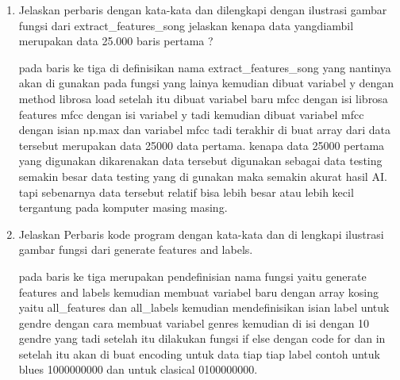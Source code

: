 \begin{enumerate}
\begin{figure}[!htbp]
      \caption{Ilustrasi gambar fungsi dari display\_mfcc() }
      \label{c122}
      \end{figure}

Gambar \ref{c122} tersebut merupakan hasil dari mfcc dari salah satu gender lagu pop yang ada pada datasets yang 1000 atau terdapat dalam sepuluh folder tadi.

\item Jelaskan perbaris dengan kata-kata dan dilengkapi dengan ilustrasi gambar fungsi dari extract\_features\_song jelaskan kenapa data yangdiambil merupakan data 25.000 baris pertama ? 



\subitem pada baris ke tiga di definisikan nama extract\_features\_song yang nantinya akan di gunakan pada fungsi yang lainya kemudian dibuat variabel y dengan method librosa load setelah itu dibuat variabel baru mfcc dengan isi librosa features mfcc dengan isi variabel y tadi kemudian dibuat variabel mfcc dengan isian np.max dan variabel mfcc tadi terakhir di buat array dari data tersebut merupakan data 25000 data pertama. kenapa data 25000 pertama yang digunakan dikarenakan data tersebut digunakan sebagai data testing semakin besar data testing yang di gunakan maka semakin akurat hasil AI. tapi sebenarnya data tersebut relatif bisa lebih besar atau lebih kecil tergantung pada komputer masing masing.

\item Jelaskan Perbaris kode program dengan kata-kata dan di lengkapi ilustrasi gambar fungsi dari generate features and labels.



\subitem pada baris ke tiga merupakan pendefinisian nama fungsi yaitu generate features and labels kemudian membuat variabel baru dengan array kosing yaitu all\_features dan all\_labels kemudian mendefinisikan isian label untuk gendre dengan cara membuat variabel genres kemudian di isi dengan 10 gendre yang tadi setelah itu dilakukan fungsi if else dengan code for dan in setelah itu akan di buat encoding untuk data tiap tiap label contoh untuk blues 1000000000 dan untuk clasical 0100000000.


\end{enumerate}
